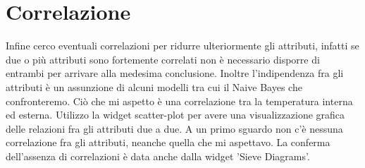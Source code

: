 \documentclass[a4paper, 12p]{report}
\begin{document}
\section{Correlazione}
Infine cerco eventuali correlazioni per ridurre ulteriormente gli attributi, infatti se due o più attributi sono fortemente correlati non è necessario disporre di entrambi per arrivare alla medesima conclusione. Inoltre l'indipendenza fra gli attributi è un assunzione di alcuni modelli tra cui il Naive Bayes che confronteremo. Ciò che mi aspetto è una correlazione tra la temperatura interna ed esterna. Utilizzo la widget scatter-plot per avere una visualizzazione grafica delle relazioni fra gli attributi due a due. A un primo sguardo non c'è nessuna correlazione fra gli attributi, neanche quella che mi aspettavo. La conferma dell'assenza di correlazioni è data anche dalla widget 'Sieve Diagrams'.  
\end{document}

